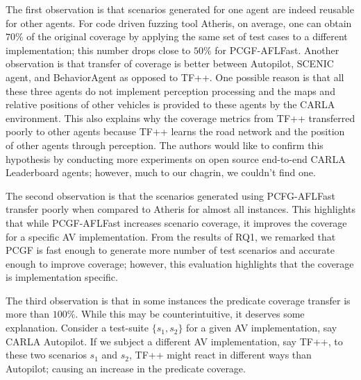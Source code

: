 The first observation is that scenarios generated for one agent are indeed reusable for other agents.
%
For code driven fuzzing tool Atheris, on average, one can obtain $70\%$ of the original coverage by applying the same set of test cases to a different implementation; this number drops close to $50\%$ for PCGF-AFLFast.
% 
%
% 
% 
Another observation is that transfer of coverage is better between Autopilot, SCENIC agent, and BehaviorAgent as opposed to TF++.
% 
One possible reason is that all these three agents do not implement perception processing and the maps and relative positions of other vehicles is provided to these agents by the CARLA environment.
% 
This also explains why the coverage metrics from TF++ transferred poorly to other agents because TF++ learns the road network and the position of other agents through perception.
% 
The authors would like to confirm this hypothesis by conducting more experiments on open source end-to-end CARLA Leaderboard agents; however, much to our chagrin, we couldn't find one.
% 

The second observation is that the scenarios generated using PCFG-AFLFast transfer poorly when compared to Atheris for almost all instances.
% 
This highlights that while PCGF-AFLFast increases scenario coverage, it improves the coverage for a specific AV implementation.
% 
From the results of RQ1, we remarked that PCGF is fast enough to generate more number of test scenarios and accurate enough to improve coverage; however, this evaluation highlights that the coverage is implementation specific.

The third observation is that in some instances the predicate coverage transfer is more than $100\%$. 
% 
While this may be counterintuitive, it deserves some explanation.
% 
Consider a test-suite $\{ s_1, s_2 \}$ for a given AV implementation, say CARLA Autopilot.
% 
If we subject a different AV implementation, say TF++, to these two scenarios $s_1$ and $s_2$, TF++ might react in different ways than Autopilot; causing an increase in the predicate coverage.



